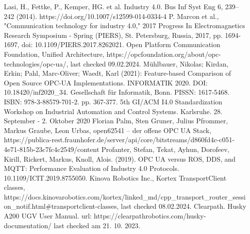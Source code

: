 \documentclass[conference]{IEEEtran}
\begin{document}
\begin{thebibliography}{00}
Lasi, H., Fettke, P., Kemper, HG. et al. Industry 4.0. Bus Inf Syst Eng 6, 239–242 (2014). https://doi.org/10.1007/s12599-014-0334-4
 P. Marcon et al., "Communication technology for industry 4.0," 2017 Progress In Electromagnetics Research Symposium - Spring (PIERS), St. Petersburg, Russia, 2017, pp. 1694-1697, doi: 10.1109/PIERS.2017.8262021.
Open Platform Communication Foundation, Unified Architecture, https://opcfoundation.org/about/opc-technologies/opc-ua/, last checked 09.02.2024.
Mühlbauer, Nikolas; Kirdan, Erkin; Pahl, Marc-Oliver; Waedt, Karl (2021): Feature-based Comparison of Open Source OPC-UA Implementations. INFORMATIK 2020. DOI: 10.18420/inf2020\_34. Gesellschaft für Informatik, Bonn. PISSN: 1617-5468. ISBN: 978-3-88579-701-2. pp. 367-377. 5th GI/ACM I4.0 Standardization Workshop on Industrial Automation and Control Systems. Karlsruhe. 28. September - 2. Oktober 2020
Florian Palm, Sten Gruner, Julius Pfrommer, Markus Graube, Leon Urbas, open62541 – der offene OPC UA Stack, https://publica-rest.fraunhofer.de/server/api/core/bitstreams/d860fd4c-c051-4e71-815b-23c7fc4c2549/content
 Profanter, Stefan, Tekat, Ayhun, Dorofeev, Kirill, Rickert, Markus, Knoll, Alois. (2019). OPC UA versus ROS, DDS, and MQTT: Performance Evaluation of Industry 4.0 Protocols. 10.1109/ICIT.2019.8755050. 
 Kinova Robotics Inc., Kortex TransportClient classes, https://docs.kinovarobotics.com/kortex/linked\_md/cpp\_transport\_router\_session\_notif.html\#transportclient-classes, last checked 08.02.2024.
 Clearpath. Husky A200 UGV User Manual. url: https://clearpathrobotics.com/husky-documentation/ last checked am 21. 10. 2023.
\end{thebibliography}
\end{document}
